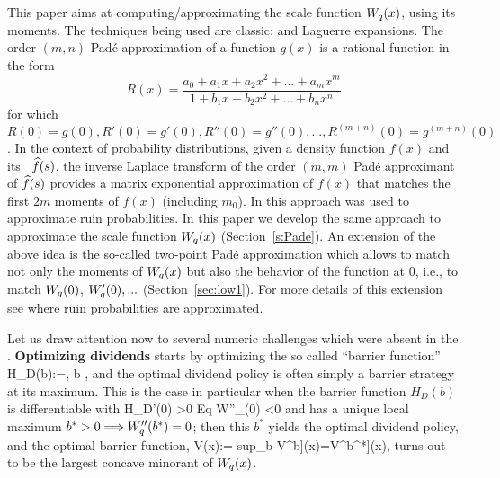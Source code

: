 This paper aims at computing/approximating the scale function $W_{q}(x)$,
using its moments. The techniques being used are classic: \Pd and Laguerre
expansions.  The order $(m,n)$ Pad\'e approximation of a function $g(x)$ is
a rational function in the form
\[
R(x)=\frac{a_0+a_1 x+a_2 x^2+...+a_m x^m}{1+b_1 x+b_2 x^2+...+b_n x^n}
\]
for which
$R(0)=g(0),R'(0)=g'(0),R''(0)=g''(0),...,R^{(m+n)}(0)=g^{(m+n)}(0)$.  In
the context of probability distributions, given a density function $f(x)$
and its \LT \ $\widehat f(s)$, the inverse Laplace transform of the order $(m,m)$
Pad\'e approximant of $\widehat f(s)$ provides a matrix exponential approximation
of $f(x)$ that matches the first $2m$ moments of $f(x)$ (including $m_0$).
In \cite{avram2011moments} this approach was used to approximate ruin probabilities.  In
this paper we develop the same approach to approximate the scale function
$W_{q}(x)$ (Section~\ref{s:Pade}).  An extension of the above idea is the
so-called two-point Pad\'e approximation which allows to match not only the
moments of $W_{q}(x)$ but also the behavior of the function at 0, i.e., to
match $W_{q}(0)$, $W'_{q}(0),...$ (Section~\ref{sec:low1}).
For more details of this extension see  \cite{ABH} where ruin
probabilities are approximated.


\begin{comment}
  \beR   Note that when $\q=0$, the scale function $W_0$ coincides, up to
  a \prop  \ct,  with the well-studied  \surp \ (just compare \eqr{WLT}
  with the famous \PK  \LT \ \eqr{PK0}).
  It appears thus that at the slight additional expense of inverting
  the  \LT \ \eqr{WLT} instead of  \eqr{PK0}, one may obtain the solution of numerous sophisticated control problems \cite{Kyp,AGV} (which are however similar
  in effort to obtaining ruin probabilities).
\eeR
\end{comment}

Let us draw attention now to several numeric challenges which were absent in the \rp \prob.
\BEN \im
{\bf Optimizing dividends} starts by optimizing the so called ``barrier function'' \be H_D(b):=, \; b , \ee
   and   the optimal dividend policy is  often simply a barrier strategy at its   maximum. This is the case in particular when the barrier function $H_D(b)$  is differentiable
with
\be H_D'(0) >0 Eq W''_\q(0) <0\ee
and has a unique local maximum $b^*>0 \Longrightarrow W''_q(b^*)=0$; then this $b^*$ yields the optimal dividend policy, and
the optimal barrier function,
  \be {} V(x):= sup_{b } V^{b]}(x)=V^{b^*]}(x),\ee
  turns out to be the largest concave minorant  of  $W_q(x)$.

